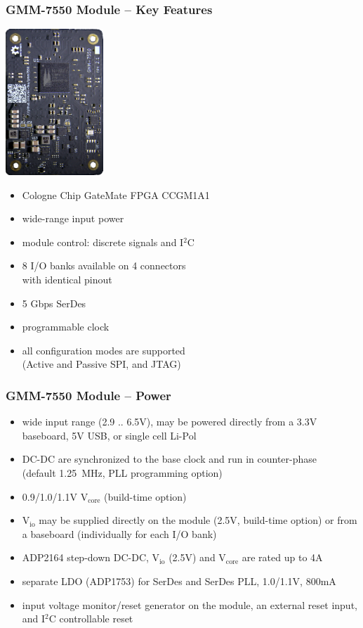 \begin{frame}
  \frametitle{GMM-7550 Module -- Key Features}

  \begin{flushright}
    \includegraphics[height=5.5cm]{gmm7550.jpg}
  \end{flushright}
  \vspace{-5.5cm}

  \begin{minipage}{9cm}
  \begin{itemize}
  \item Cologne Chip GateMate FPGA CCGM1A1
  \item wide-range input power
  \item module control: discrete signals and I$^2$C
  \item 8 I/O banks available on 4 connectors\\with identical pinout
  \item 5 Gbps SerDes
  \item programmable clock
  \item all configuration modes are supported\\(Active and Passive SPI,
  and JTAG)
  \end{itemize}
  \end{minipage}
\end{frame}

\begin{frame}
  \frametitle{GMM-7550 Module -- Power}
  \begin{itemize}
  \item wide input range (2.9 .. 6.5V), may be powered directly from a
  3.3V baseboard, 5V USB, or single cell Li-Pol
  \item DC-DC are synchronized to the base clock and run in
  counter-phase\\(default 1.25~MHz, PLL programming option)
  \item 0.9/1.0/1.1V V$_{\text{core}}$ (build-time option)
  \item V$_{\text{io}}$ may be supplied directly on the module (2.5V, build-time
  option) or from\\a baseboard (individually for each I/O bank)
  \item ADP2164 step-down DC-DC, V$_{\text{io}}$ (2.5V) and V$_{\text{core}}$ are rated up to 4A
  \item separate LDO (ADP1753) for SerDes and SerDes PLL, 1.0/1.1V, 800mA
  \item input voltage monitor/reset generator on the module, an
  external reset input, and I$^2$C controllable reset
  \end{itemize}
\end{frame}

